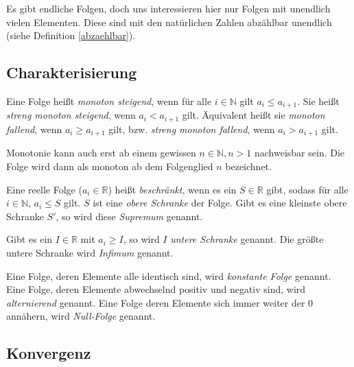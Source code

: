 Es gibt endliche Folgen, doch uns interessieren hier nur Folgen mit unendlich vielen Elementen. Diese sind mit den natürlichen Zahlen abzählbar unendlich (siehe Definition \ref{abzaehlbar}).

\subsection{Charakterisierung}

\begin{definition}
Eine Folge heißt \emph{monoton steigend}, wenn für alle $i\in \mathbb{N}$ gilt $a_i\le a_{i+1}$. Sie heißt \emph{streng monoton steigend}, wenn $a_i < a_{i+1}$ gilt. Äquivalent heißt sie \emph{monoton fallend}, wenn $a_i\ge a_{i+1}$ gilt, bzw. \emph{streng monoton fallend}, wenn $a_i > a_{i+1}$ gilt.
\end{definition}

Monotonie kann auch erst ab einem gewissen $n\in \mathbb{N}, n>1$ nachweisbar sein. Die Folge wird dann als monoton ab dem Folgenglied $n$ bezeichnet.

\begin{definition}
Eine reelle Folge ($a_i \in \mathbb{R}$) heißt \emph{beschränkt}, wenn es ein $S\in \mathbb{R}$ gibt, sodass für alle $i\in \mathbb{N}$, $a_i \le S$ gilt. $S$ ist eine \emph{obere Schranke} der Folge. Gibt es eine kleinste obere Schranke $S'$, so wird diese \emph{Supremum} genannt. 

Gibt es ein $I\in \mathbb{R}$ mit $a_i \ge I$, so wird $I$ \emph{untere Schranke} genannt. Die größte untere Schranke wird \emph{Infimum} genannt.
\end{definition}

\begin{definition}
Eine Folge, deren Elemente alle identisch sind, wird \emph{konstante Folge} genannt. Eine Folge, deren Elemente abwechselnd positiv und negativ sind, wird \emph{alternierend} genannt. Eine Folge deren Elemente sich immer weiter der 0 annähern, wird \emph{Null-Folge} genannt.
\end{definition}

\subsection{Konvergenz}

